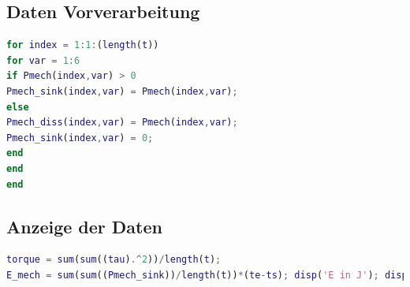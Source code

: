 \subsection{Daten Vorverarbeitung}
%
\begin{lstlisting}[language=Matlab, numbers=none]
for index = 1:1:(length(t))
for var = 1:6
if Pmech(index,var) > 0
Pmech_sink(index,var) = Pmech(index,var);
else
Pmech_diss(index,var) = Pmech(index,var);
Pmech_sink(index,var) = 0;
end
end
end
\end{lstlisting}
%
\subsection{Anzeige der Daten}
%
\begin{lstlisting}[language=Matlab, numbers=none]
torque = sum(sum((tau).^2))/length(t);
E_mech = sum(sum((Pmech_sink))/length(t))*(te-ts); disp('E in J'); disp(E_mech);
\end{lstlisting}
%
%
\setcounter{chapter}{5}
\setcounter{section}{0}
\setcounter{table}{0}
\setcounter{figure}{0}
